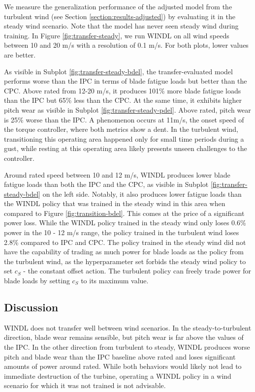 We measure the generalization performance of the adjusted model from the turbulent wind (see Section \ref{section:results-adjusted}) by evaluating it in the steady wind scenario. Note that the model has never seen steady wind during training. In Figure \ref{fig:transfer-steady}, we run WINDL on all wind speeds between 10 and 20 m/s with a resolution of 0.1 m/s. For both plots, lower values are better.

As visible in Subplot \ref{fig:transfer-steady-bdel}, the transfer-evaluated model performs worse than the IPC in terms of blade fatigue loads but better than the CPC. Above rated from 12-20 m/s, it produces 101\% more blade fatigue loads than the IPC but 65\% less than the CPC. At the same time, it exhibits higher pitch wear as visible in Subplot \ref{fig:transfer-steady-pdel}. Above rated, pitch wear is 25\% worse than the IPC. A phenomenon occurs at 11m/s, the onset speed of the torque controller, where both metrics show a dent. In the turbulent wind, transitioning this operating area happened only for small time periods during a gust, while resting at this operating area likely presents unseen challenges to the controller.

Around rated speed between 10 and 12 m/s, WINDL produces lower blade fatigue loads than both the IPC and the CPC, as visible in Subplot \ref{fig:transfer-steady-bdel} on the left side. Notably, it also produces lower fatigue loads than the WINDL policy that was trained in the steady wind in this area when compared to Figure \ref{fig:transition-bdel}. This comes at the price of a significant power loss. While the WINDL policy trained in the steady wind only loses 0.6\% power in the 10 - 12 m/s range, the policy trained in the turbulent wind loses 2.8\% compared to IPC and CPC. The policy trained in the steady wind did not have the capability of trading as much power for blade loads as the policy from the turbulent wind, as the hyperparameter set forbids the steady wind policy to set $c_S$ - the constant offset action. The turbulent policy can freely trade power for blade loads by setting $c_S$ to its maximum value.

\subsection{Discussion}
\label{section:results-transfer-discussion}


WINDL does not transfer well between wind scenarios. In the steady-to-turbulent direction, blade wear remains sensible, but pitch wear is far above the values of the IPC. In the other direction from turbulent to steady, WINDL produces worse pitch and blade wear than the IPC baseline above rated and loses significant amounts of power around rated. While both behaviors would likely not lead to immediate destruction of the turbine, operating a WINDL policy in a wind scenario for which it was not trained is not advisable.

